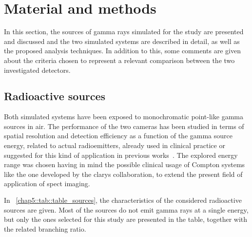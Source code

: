 \section{Material and methods}\label{chap5::sec::mat_met}
In this section, the sources of gamma rays simulated for the study are presented and discussed and the two simulated systems are described in detail, as well as the proposed analysis techniques. In addition to this, some comments are given about the criteria chosen to represent a relevant comparison between the two investigated detectors.

\subsection{Radioactive sources}\label{chap5::subsec::rad_sources}

Both  simulated systems have been exposed to monochromatic point-like gamma sources in air.
The performance of the two cameras has been studied in terms of spatial resolution and detection efficiency as a function of the gamma source energy, related to actual radioemitters, already used in clinical practice or suggested for this kind of application in previous works~\parencite{Nurdan2015}. The explored energy range was chosen having in mind the possible clinical usage of Compton systems like the one developed by the \gls{clarys} collaboration, to extend the present field of application of \gls{spect} imaging.

In \tablename~\ref{chap5::tab::table_sources}, the characteristics of the considered radioactive sources are given. Most of the sources do not emit gamma rays at a single energy, but only the ones selected for this study are presented in the table, together with the related branching ratio.

